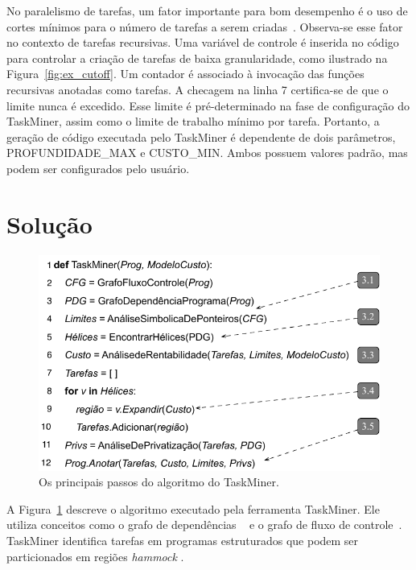 \documentclass[sigconf]{acmart}
\newcommand\Taskminer{\mbox{\textsf{TaskMiner}}}
\begin{document}
No paralelismo de tarefas, um fator importante para bom desempenho
é o uso de cortes mínimos para o número de tarefas a serem criadas~\cite{Duran08b}. 
Observa-se esse fator no contexto de tarefas recursivas. 
Uma variável de controle é inserida no código para controlar
a criação de tarefas de baixa granularidade, como ilustrado na Figura~\ref{fig:ex_cutoff}. 
Um contador é associado à invocação das funções recursivas anotadas como tarefas. 
A checagem na linha 7 certifica-se de que o limite
nunca é excedido. Esse limite é pré-determinado na fase de configuração do 
{\Taskminer}, assim como o limite de trabalho mínimo
por tarefa. Portanto, a geração 
de código executada pelo {\Taskminer} é dependente de dois parâmetros,
\textsf{PROFUNDIDADE\_MAX} e \textsf{CUSTO\_MIN}. 
Ambos possuem valores padrão, mas podem ser configurados pelo usuário.	

\section{Solu\c{c}\~{a}o}
\label{sec:sol}

\begin{figure}[b]
\begin{center}
\includegraphics[width=1\columnwidth]{images/alg_main}
\caption{Os principais passos do algoritmo do TaskMiner.}
\label{fig:alg_main}
\end{center}
\end{figure}

A Figura~\ref{fig:alg_main} descreve o algoritmo executado pela ferramenta {\Taskminer}. 
Ele utiliza conceitos  como
o grafo de dependências ~\cite{Ferrante87} e o 
grafo de fluxo de controle~\cite{Kildall73}. {\Taskminer}
identifica tarefas em programas estruturados que podem
ser particionados em regiões \textit{hammock}
\cite{Ferrante87}.
\end{document}
